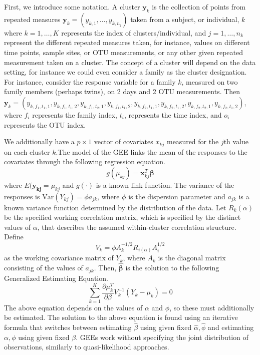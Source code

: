 \documentclass[12pt]{article}
\begin{document}
First, we introduce some notation. A cluster $\mathbf{y}_k$ is the collection of points from repeated measures $\mathbf{y}_k = (y_{k,1}, \ldots , y_{k,n_j})$ taken from a subject, or individual, $k$ where $k = 1, \ldots , K$ represents the index of clusters/individual, and $j = 1, \ldots , n_k$ represent the different repeated measures taken, for instance, values on different  time points, sample sites, or OTU measurements, or any other given repeated measurement taken on a cluster.
The concept of a cluster will depend on the data setting, for instance we could even consider a family as the cluster designation. For instance, consider the response variable for a family $k$, measured on two family members (perhaps twins), on 2 days and 2 OTU measurements. Then $\mathbf{y}_k = (y_{k, f_1,t_1,1}, y_{k, f_1,t_1,2}, y_{k, f_1,t_2,1}, y_{k, f_1,t_1,2},y_{k, f_2,t_1,1}, y_{k, f_2,t_1,2}, y_{k, f_2,t_2,1}, y_{k, f_2,t_1,2})$, where $f_i$ represents the family index, $t_i$, represents the time index, and $o_i$ represents the OTU index.

We additionally have a $p \times 1$ vector of covariates $x_{kj}$ measured for the $j$th value on each cluster $k$.The model of the GEE links the mean of the responses to the covariates through the following regression equation.
$$g(\mu_{kj}) = \mathbf{x}_{kj}^T\boldsymbol \beta$$
where $E(\mathbf{y_{kj}} = \mu_{kj}$ and $g(\cdot)$ is a known link function. The variance of the responses is $\text{Var}(Y_{kj}) = \phi a_{jk}$, where $\phi$ is the dispersion parameter and $a_{jk}$ is a known variance function determined by the distribution of the data. Let $R_k(\alpha)$ be the specified working correlation matrix, which is specified by the distinct values of $\alpha$, that describes the assumed within-cluster correlation structure. Define
$$V_k = \phi A_k^{-1/2} R_{i(\alpha)}A_i^{1/2}$$ as the working covariance matrix of $Y_k$, where $A_k$ is the diagonal matrix consisting of the values of $a_{jk}$. Then, $\hat{\boldsymbol\beta}$ is the solution to the following Generalized Estimating Equation.
$$\sum_{k=1}^K \frac{\partial  \mu_k^T }{\partial \beta } V_{k}^{-1} (Y_k - \mu_k) = 0 $$
The above equation depends on the values of $\alpha$ and $\phi$, so these must additionally be estimated. The solution to the above equation is found using an iterative formula that switches between estimating $\hat\beta$ using given fixed $\hat \alpha, \hat \phi$ and estimating $\alpha,  \phi$ using given fixed $\beta$. GEEs work without specifying the joint distribution of observations, similarly to quasi-likelihood approaches.
\end{document}

